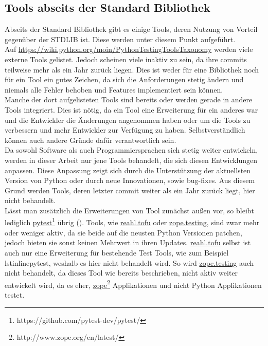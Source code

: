 \subsection{Tools abseits der Standard Bibliothek}\label{python-tools:extlib}
Abseits der Standard Bibliothek gibt es einige Tools, deren Nutzung von
Vorteil gegenüber der STDLIB ist. Diese werden unter diesem Punkt aufgeführt.
\newline
\\
Auf \url{https://wiki.python.org/moin/PythonTestingToolsTaxonomy} werden viele
externe Tools gelistet. Jedoch scheinen viele inaktiv zu sein, da ihre
\glspl{commit} teilweise mehr als ein Jahr zurück liegen. Dies ist weder für
eine Bibliothek noch für ein Tool ein gutes Zeichen, da sich die Anforderungen
stetig ändern und niemals alle Fehler behoben und Features implementiert sein
können.
\newline
\\
Manche der dort aufgelisteten Tools sind bereits oder werden gerade in andere
Tools integriert. Dies ist nötig, da ein Tool eine Erweiterung für ein anderes
war und die Entwickler die Änderungen angenommen haben oder um die Tools zu
verbessern und mehr Entwickler zur Verfügung zu haben. Selbstverständlich
können auch andere Gründe dafür verantwortlich sein.
\newline
\\
Da sowohl Software als auch Programmiersprachen sich stetig weiter entwickeln,
werden in dieser Arbeit nur jene Tools behandelt, die sich diesen Entwicklungen
anpassen. Diese Anpassung zeigt sich durch die Unterstützung der aktuellsten
Version von Python oder durch neue Innovationen, sowie \Gls{bug}-fixes. Aus
diesem Grund werden Tools, deren letzter \Gls{commit} weiter als ein Jahr
zurück liegt, hier nicht behandelt.
\newline
\\
Lässt man zusätzlich die Erweiterungen von Tool zunächst außen vor, so bleibt
lediglich
\href{https://github.com/pytest-dev/pytest/}{pytest}\footnote{https://github.com/pytest-dev/pytest/}
übrig (\cite{wiki.python:PythonTestingToolsTaxonomy}).
Tools, wie
\href{https://www.reahl.org/docs/4.0/devtools/tofu.d.html}{reahl.tofu}
oder
\href{https://pypi.org/project/zope.testing/}{zope.testing},
sind zwar mehr oder weniger aktiv, da sie beide auf die neusten Python
Versionen patchen, jedoch bieten sie sonst keinen Mehrwert in ihren Updates.
\href{https://www.reahl.org/docs/4.0/devtools/tofu.d.html}{reahl.tofu}
selbst ist auch nur eine Erweiterung für bestehende Test Tools, wie zum
Beispiel lstinline{pytest}, weshalb es hier nicht behandelt wird. So wird
\href{https://pypi.org/project/zope.testing/}{zope.testing}
auch nicht behandelt, da dieses Tool wie bereits beschrieben, nicht aktiv weiter
entwickelt wird, da es eher,
\href{http://www.zope.org/en/latest/}{zope}\footnote{http://www.zope.org/en/latest/}
Applikationen und nicht Python Applikationen testet.

